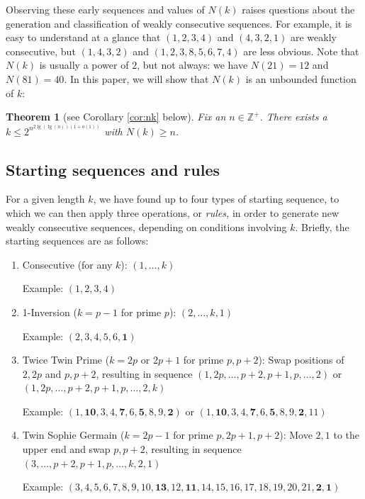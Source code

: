 \documentclass{article}
\newtheorem{theorem}{Theorem}[section]
\theoremstyle{definition}
\theoremstyle{remark}
\numberwithin{equation}{section}
\numberwithin{case}{theorem}
\begin{document}
Observing these early sequences and values of $N(k)$ raises questions about the generation and classification of weakly consecutive sequences. For example, it is easy to understand at a glance that $(1,2,3,4)$ and $(4,3,2,1)$ are weakly consecutive, but $(1,4,3,2)$ and $(1,2,3,8,5,6,7,4)$ are less obvious. Note that $N(k)$ is usually a power of $2$, but not always: we have $N(21) = 12$ and $N(81) = 40$. In this paper, we will show that $N(k)$ is an unbounded function of $k$:
\begin{theorem}[see Corollary \ref{cor:nk} below]
  Fix an $n \in \mathbb{Z}^+$. There exists a $k \leq 2^{n^{2 \lg(\lg (n)) (1 + o(1))}}$ with $N(k) \geq n$.
\end{theorem}

\subsection{Starting sequences and rules}
For a given length $k$, we have found up to four types of starting sequence, to which we can then apply three operations, or \emph{rules,} in order to generate new weakly consecutive sequences, depending on conditions involving $k$. Briefly, the starting sequences are as follows:
\begin{enumerate}
    \item Consecutive (for any $k$): $(1,\dots,k)$

    Example: $(1,2,3,4)$
    \item 1-Inversion ($k=p-1$ for prime $p$): $(2,\dots,k,1)$

    Example: $(2,3,4,5,6,\mathbf{1})$
    \item Twice Twin Prime ($k=2p$ or $2p+1$ for prime $p,p+2$): Swap positions of $2, 2p$ and $p,p+2$, resulting in sequence $(1, 2p, \dots, p+2, p+1, p, \dots, 2)$ or $(1, 2p, \dots, p+2, p+1, p, \dots, 2, k)$

    Example: $(1,\mathbf{10},3,4,\mathbf{7},6,\mathbf{5},8,9,\mathbf{2})$ or $(1,\mathbf{10},3,4,\mathbf{7},6,\mathbf{5},8,9,\mathbf{2},11)$
    \item Twin Sophie Germain ($k=2p-1$ for prime $p,2p+1,p+2$): Move $2,1$ to the upper end and swap $p,p+2$, resulting in sequence $(3,\dots, p+2, p+1, p, \dots, k, 2, 1)$

    Example: $(3,4,5,6,7,8,9,10,\mathbf{13},12,\mathbf{11},14,15,16,17,18,19,20,21,\mathbf{2},\mathbf{1})$
\end{enumerate}
\end{document}
